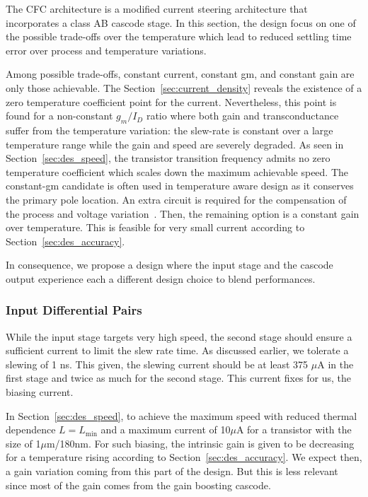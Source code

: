 The CFC architecture is a modified current steering architecture that incorporates a class AB cascode stage. In this section, the design focus on one of the possible trade-offs over the temperature which lead to reduced settling time error over process and temperature variations.

Among possible trade-offs, constant current, constant gm, and constant gain are only those achievable. The Section~\ref{sec:current_density} reveals the existence of a zero temperature coefficient point for the current. Nevertheless, this point is found for a non-constant \(g_m/I_D \) ratio where both gain and transconductance suffer from the temperature variation: the slew-rate is constant over a large temperature range while the gain and speed are severely degraded. As seen in Section~\ref{sec:des_speed}, the transistor transition frequency admits no zero temperature coefficient which scales down the maximum achievable speed. The constant-gm candidate is often used in temperature aware design as it conserves the primary pole location. An extra circuit is required for the compensation of the process and voltage variation~\cite{Chu2014}. Then, the remaining option is a constant gain over temperature. This is feasible for very small current according to Section~\ref{sec:des_accuracy}.

In consequence, we propose a design where the input stage and the cascode output experience each a different design choice to blend performances.

\subsubsection{Input Differential Pairs}
While the input stage targets very high speed, the second stage should ensure a sufficient current to limit the slew rate time. As discussed earlier, we tolerate a slewing of 1 ns. This given, the slewing current should be at least 375 \(\mu \)A in the first stage and twice as much for the second stage. This current fixes for us, the biasing current.

In Section~\ref{sec:des_speed}, to achieve the maximum speed with reduced thermal dependence \(L=L_{\min} \) and a maximum current of 10\(\mu \)A for a transistor with the size of 1\(\mu \)m/180nm. For such biasing, the intrinsic gain is given to be decreasing for a temperature rising according to Section~\ref{sec:des_accuracy}. We expect then, a gain variation coming from this part of the design. But this is less relevant since most of the gain comes from the gain boosting cascode.

